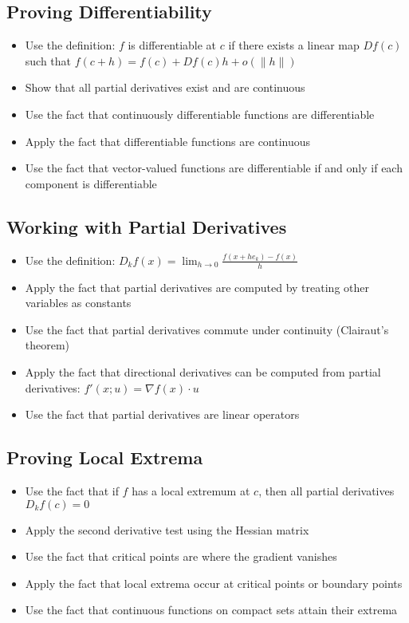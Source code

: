 \subsection*{Proving Differentiability}
\begin{itemize}
\item Use the definition: $f$ is differentiable at $c$ if there exists a linear map $Df(c)$ such that $f(c+h) = f(c) + Df(c)h + o(\|h\|)$
\item Show that all partial derivatives exist and are continuous
\item Use the fact that continuously differentiable functions are differentiable
\item Apply the fact that differentiable functions are continuous
\item Use the fact that vector-valued functions are differentiable if and only if each component is differentiable
\end{itemize}

\subsection*{Working with Partial Derivatives}
\begin{itemize}
\item Use the definition: $D_k f(x) = \lim_{h \to 0} \frac{f(x + he_k) - f(x)}{h}$
\item Apply the fact that partial derivatives are computed by treating other variables as constants
\item Use the fact that partial derivatives commute under continuity (Clairaut's theorem)
\item Apply the fact that directional derivatives can be computed from partial derivatives: $f'(x;u) = \nabla f(x) \cdot u$
\item Use the fact that partial derivatives are linear operators
\end{itemize}

\subsection*{Proving Local Extrema}
\begin{itemize}
\item Use the fact that if $f$ has a local extremum at $c$, then all partial derivatives $D_k f(c) = 0$
\item Apply the second derivative test using the Hessian matrix
\item Use the fact that critical points are where the gradient vanishes
\item Apply the fact that local extrema occur at critical points or boundary points
\item Use the fact that continuous functions on compact sets attain their extrema
\end{itemize}

